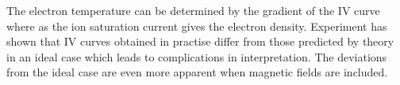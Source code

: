 \documentclass[12pt]{article}
\begin{document}
The electron temperature can be determined by the gradient of the IV curve where as the ion saturation current gives the electron density. Experiment has shown that IV curves obtained in practise differ from those predicted by theory in an ideal case which leads to complications in interpretation. The deviations from the ideal case are even more apparent when magnetic fields are included. 
\end{document}
